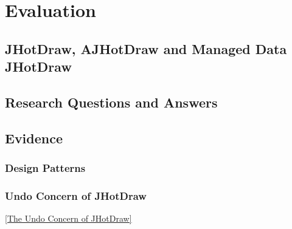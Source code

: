 
\chapter{Evaluation}\label{Evaluation}

\section{JHotDraw, AJHotDraw and Managed Data JHotDraw}

\section{Research Questions and Answers}\label{Research Questions and Answers}

\section{Evidence}\label{Evidence}

\subsection{Design Patterns}\label{Design Patterns JHotDraw}

\subsection{Undo Concern of JHotDraw}\label{Undo JHotDraw}

\ref{The Undo Concern of JHotDraw}



